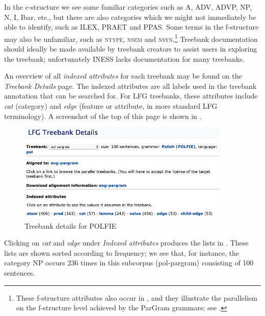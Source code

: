 \documentclass[output=paper,hidelinks]{langscibook}
\begin{document}
In the c-structure we see some familiar categories such as A, ADV, ADVP, NP, N, I, Ibar, etc., but there are also categories which we might not immediately be able to identify, such as ILEX, PRAET and PPAS.
Some terms in the f-structure may also be unfamiliar, such as \textsc{ntype}, \textsc{nsem} and \textsc{nsyn}.\footnote{These f-structure attributes also occur in , and they illustrate the parallelism on the f-structure level achieved by the ParGram grammars; see .}
Treebank documentation should ideally be made available by treebank creators to assist users in exploring the treebank; unfortunately INESS lacks documentation for many treebanks. %

An overview of all \textit{indexed attributes} for each treebank may be found on the \emph{Treebank Details} page.
The indexed attributes are all labels used in the treebank annotation that can be searched for.
For LFG treebanks, these attributes include \textit{cat} (category) and \textit{edge} (feature or attribute, in more standard LFG terminology). 
A screenshot of the top of this page is shown in .

\begin{figure}
    \includegraphics[width=0.9\textwidth]{figures/Treebanks/details}
    \caption{Treebank details for POLFIE}
    \label{fig:details}
\end{figure}

Clicking on \textit{cat} and \textit{edge} under \textit{Indexed attributes} produces the lists in .
These lists are shown sorted according to frequency; we see that, for instance, the category NP occurs 236 times in this subcorpus (pol-pargram) consisting of 100 sentences. %
\end{document}
